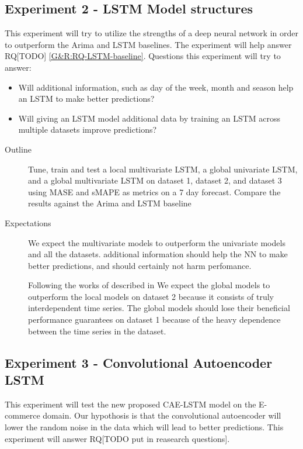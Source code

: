 \subsection{Experiment 2 - LSTM Model structures}
This experiment will try to utilize the strengths of a deep neural network
in order to outperform the Arima and LSTM baselines. The experiment will
help answer RQ[TODO] \cref{G&R:RQ-LSTM-baseline}.
Questions this experiment will try to answer:
\begin{itemize}
  \item Will additional information, such as day of the week, month and season help an LSTM to make better predictions?
  \item {Will giving an LSTM model additional data by training an LSTM across multiple datasets improve predictions?}
\end{itemize}

\begin{description}
  \item[Outline]{Tune, train and test a local multivariate LSTM, a global univariate LSTM,
              and a global multivariate LSTM on dataset 1,
              dataset 2, and dataset 3 using MASE and sMAPE as metrics on a 7 day forecast. Compare the results against the Arima and LSTM baseline}
\end{description}

\begin{description}
  \item[Expectations]{

              We expect the multivariate models to outperform the univariate models and all the datasets.
              additional information should help the NN to make better predictions, and should certainly not harm perfomance.

              Following the works of \cite{Rabanser2020} described in 
              We expect the global models to outperform the local models on dataset 2 because it consists
              of truly interdependent time series. The global models should lose their beneficial performance guarantees
              on dataset 1 because of the heavy dependence between the time series in the dataset.

        }
\end{description}

\subsection{Experiment 3 - Convolutional Autoencoder LSTM}
This experiment will test the new proposed CAE-LSTM model on
the E-commerce domain. Our hypothosis is that the convolutional autoencoder
will lower the random noise in the data which will lead to better predictions.
This experiment will answer RQ[TODO put in reasearch questions].

